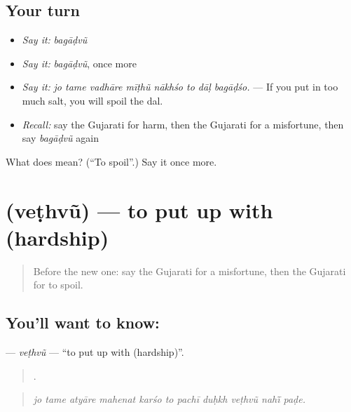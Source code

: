 \subsection*{Your turn}
\begin{itemize}
\raggedright
  \item \emph{Say it:} \emph{bagāḍvũ}
  \item \emph{Say it:} \emph{bagāḍvũ}, once more
  \item \emph{Say it:} \emph{jo tame vadhāre mīṭhũ nākhśo to dāḷ bagāḍśo.} — If you put in too much salt, you will spoil the dal.
  \item \emph{Recall:} say the Gujarati for harm, then the Gujarati for a misfortune, then say \emph{bagāḍvũ} again
\end{itemize}

\begin{tcolorbox}[breakable,colback=teal!4,colframe=teal!35!black,title={Before you move on}]
What does  mean? (\textquotedblleft{}To spoil\textquotedblright{}.) Say it once more.
\end{tcolorbox}
\section[\texorpdfstring{\gu{વેઠવું} (veṭhvũ)}{વેઠવું (veṭhvũ)}]{ (veṭhvũ) — to put up with (hardship)}

\label{lesson:GU-C370-vethvu}



\begin{quote}
Before the new one: say the Gujarati for a misfortune, then the Gujarati for to spoil.
\end{quote}

\subsection*{You'll want to know: }
\textbf{} — \emph{veṭhvũ} — \textquotedblleft{}to put up with (hardship)\textquotedblright{}.

\begin{quote}
          .
\end{quote}

\begin{quote}
\emph{jo tame atyāre mahenat karśo to pachī duḥkh veṭhvũ nahī̃ paḍe.}
\end{quote}

